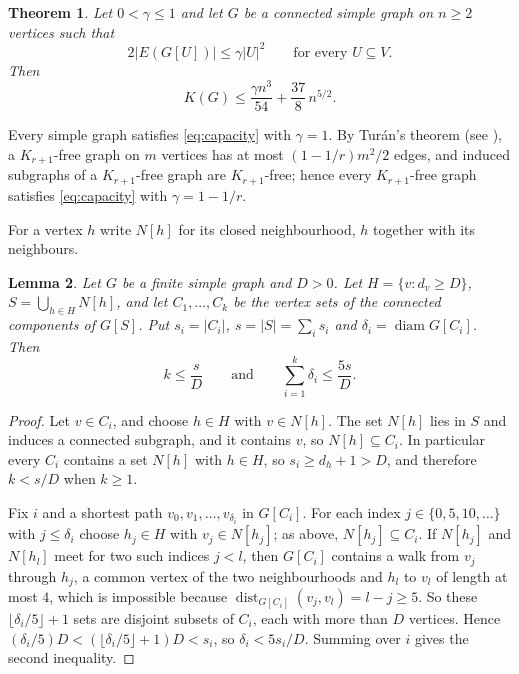 \documentclass[11pt]{amsart}
\numberwithin{equation}{section}
\newtheorem{theorem}{Theorem}[section]
\newtheorem{lemma}[theorem]{Lemma}
\theoremstyle{remark}
\newcommand{\dist}{\operatorname{dist}}
\newcommand{\diam}{\operatorname{diam}}
\begin{document}
\begin{theorem}\label{thm:capacity}
Let $0<\gamma\le1$ and let $G$ be a connected simple graph on $n\ge2$ vertices such that
\begin{equation}\label{eq:capacity}
2|E(G[U])|\le\gamma|U|^2\qquad\text{for every }U\subseteq V.
\end{equation}
Then
\[
K(G)\le\frac{\gamma n^3}{54}+\frac{37}{8}\,n^{5/2}.
\]
\end{theorem}

Every simple graph satisfies \eqref{eq:capacity} with $\gamma=1$. By Tur\'an's theorem (see \cite{MS}), a $K_{r+1}$-free graph on $m$ vertices has at most $(1-1/r)m^2/2$ edges, and induced subgraphs of a $K_{r+1}$-free graph are $K_{r+1}$-free; hence every $K_{r+1}$-free graph satisfies \eqref{eq:capacity} with $\gamma=1-1/r$.

For a vertex $h$ write $N[h]$ for its closed neighbourhood, $h$ together with its neighbours.

\begin{lemma}\label{lem:clusters}
Let $G$ be a finite simple graph and $D>0$. Let $H=\{v:d_v\ge D\}$, $S=\bigcup_{h\in H}N[h]$, and let $C_1,\dots,C_k$ be the vertex sets of the connected components of $G[S]$. Put $s_i=|C_i|$, $s=|S|=\sum_is_i$ and $\delta_i=\diam G[C_i]$. Then
\[
k\le\frac sD\qquad\text{and}\qquad\sum_{i=1}^k\delta_i\le\frac{5s}D.
\]
\end{lemma}

\begin{proof}
Let $v\in C_i$, and choose $h\in H$ with $v\in N[h]$. The set $N[h]$ lies in $S$ and induces a connected subgraph, and it contains $v$, so $N[h]\subseteq C_i$. In particular every $C_i$ contains a set $N[h]$ with $h\in H$, so $s_i\ge d_h+1>D$, and therefore $k<s/D$ when $k\ge1$.

Fix $i$ and a shortest path $v_0,v_1,\dots,v_{\delta_i}$ in $G[C_i]$. For each index $j\in\{0,5,10,\dots\}$ with $j\le\delta_i$ choose $h_j\in H$ with $v_j\in N[h_j]$; as above, $N[h_j]\subseteq C_i$. If $N[h_j]$ and $N[h_l]$ meet for two such indices $j<l$, then $G[C_i]$ contains a walk from $v_j$ through $h_j$, a common vertex of the two neighbourhoods and $h_l$ to $v_l$ of length at most $4$, which is impossible because $\dist_{G[C_i]}(v_j,v_l)=l-j\ge5$. So these $\lfloor\delta_i/5\rfloor+1$ sets are disjoint subsets of $C_i$, each with more than $D$ vertices. Hence $(\delta_i/5)D<(\lfloor\delta_i/5\rfloor+1)D<s_i$, so $\delta_i<5s_i/D$. Summing over $i$ gives the second inequality.
\end{proof}
\end{document}
